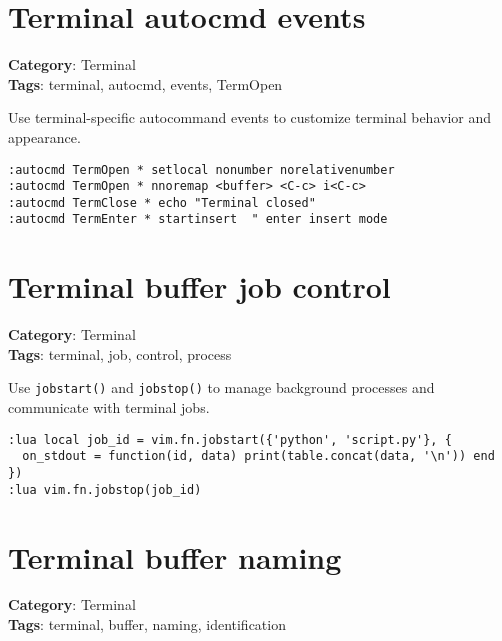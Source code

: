 {{{{{{{{{\section{Terminal autocmd events}

\textbf{Category}: Terminal\\ \textbf{Tags}: terminal, autocmd, events, TermOpen
\vspace{0.5cm}

Use terminal-specific autocommand events to customize terminal behavior and appearance.

\begin{Exa*}{}
\begin{Verbatim}[fontsize=\footnotesize, breaklines, breakanywhere]
:autocmd TermOpen * setlocal nonumber norelativenumber
:autocmd TermOpen * nnoremap <buffer> <C-c> i<C-c>
:autocmd TermClose * echo "Terminal closed"
:autocmd TermEnter * startinsert  " enter insert mode
\end{Verbatim}
\end{Exa*}

\section{Terminal buffer job control}

\textbf{Category}: Terminal\\ \textbf{Tags}: terminal, job, control, process
\vspace{0.5cm}

Use {\footnotesize \Verb§jobstart()§} and {\footnotesize \Verb§jobstop()§} to manage background processes and communicate with terminal jobs.

\begin{Exa*}{}
\begin{Verbatim}[fontsize=\footnotesize, breaklines, breakanywhere]
:lua local job_id = vim.fn.jobstart({'python', 'script.py'}, {
  on_stdout = function(id, data) print(table.concat(data, '\n')) end
})
:lua vim.fn.jobstop(job_id)
\end{Verbatim}
\end{Exa*}

\section{Terminal buffer naming}

\textbf{Category}: Terminal\\ \textbf{Tags}: terminal, buffer, naming, identification
\vspace{0.5cm}

}}}}}}}}}
